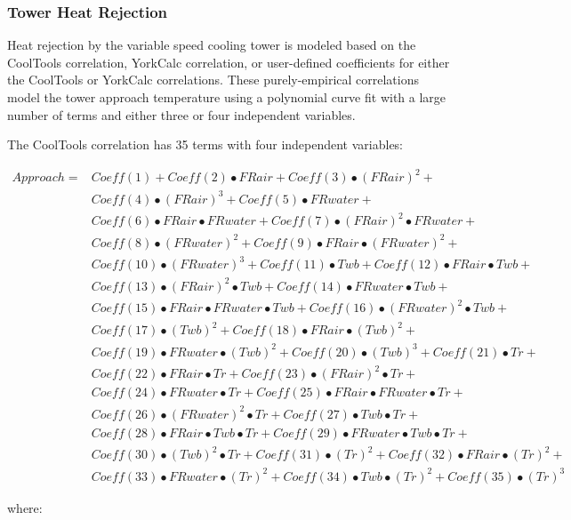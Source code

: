 \subsubsection{Tower Heat Rejection}\label{tower-heat-rejection}

Heat rejection by the variable speed cooling tower is modeled based on the CoolTools correlation, YorkCalc correlation, or user-defined coefficients for either the CoolTools or YorkCalc correlations. These purely-empirical correlations model the tower approach temperature using a polynomial curve fit with a large number of terms and either three or four independent variables.

The CoolTools correlation has 35 terms with four independent variables:

\begin{equation}
\begin{array}{rl}
Approach =& Coeff(1) + Coeff(2)•FRair + Coeff(3)•(FRair)^{2} + \\
 & Coeff(4)•(FRair)^{3} + Coeff(5)•FRwater + \\
 & Coeff(6)•FRair•FRwater + Coeff(7)•(FRair)^{2}•FRwater + \\
 & Coeff(8)•(FRwater)^{2} + Coeff(9)•FRair•(FRwater)^{2} + \\
 & Coeff(10)•(FRwater)^{3} + Coeff(11)•Twb + Coeff(12)•FRair•Twb + \\
 & Coeff(13)•(FRair)^{2}•Twb + Coeff(14)•FRwater•Twb + \\
 & Coeff(15)•FRair•FRwater•Twb + Coeff(16)•(FRwater)^{2}•Twb + \\
 & Coeff(17)•(Twb)^{2} + Coeff(18)•FRair•(Twb)^{2} + \\
 & Coeff(19)•FRwater•(Twb)^{2} + Coeff(20)•(Twb)^{3} + Coeff(21)•Tr +  \\
 & Coeff(22)•FRair•Tr + Coeff(23)•(FRair)^{2}•Tr + \\
 & Coeff(24)•FRwater•Tr + Coeff(25)•FRair•FRwater•Tr + \\
 & Coeff(26)•(FRwater)^{2}•Tr + Coeff(27)•Twb•Tr + \\
 & Coeff(28)•FRair•Twb•Tr + Coeff(29)•FRwater•Twb•Tr + \\
 & Coeff(30)•(Twb)^{2}•Tr + Coeff(31)•(Tr)^{2} + Coeff(32)•FRair•(Tr)^{2} + \\
 & Coeff(33)•FRwater•(Tr)^{2} + Coeff(34)•Twb•(Tr)^{2} + Coeff(35)•(Tr)^{3}
\end{array}
\end{equation}

where:

